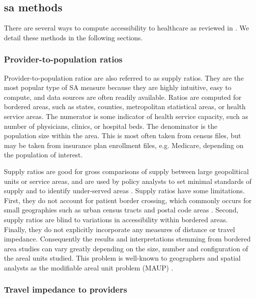 \subsection{\acf{sa} methods}

There are several ways to compute accessibility to healthcare as reviewed in \cite{guagliardo_spatial_2004}. We detail these methods in the following sections.

\subsubsection*{Provider-to-population ratios}


Provider-to-population ratios are also referred to as supply ratios. They are the most popular type of SA measure because they are highly intuitive, easy to compute, and data sources are often readily available. Ratios are computed for bordered areas, such as states, counties, metropolitan statistical areas, or health service areas. The numerator is some indicator of health service capacity, such as number of physicians, clinics, or hospital beds. The denominator is the population size within the area. This is most often taken from census files, but may be taken from insurance plan enrollment files, e.g. Medicare, depending on the population of interest.

Supply ratios are good for gross comparisons of supply between large geopolitical units or service areas, and are used by policy analysts to set minimal standards of supply and to identify under-served areas \cite{schonfeld_numbers_1972,council_on_graduate_medical_education_physician_1998,connor_competition_1995}. Supply ratios have some limitations. First, they do not account for patient border crossing, which commonly occurs for small geographies such as urban census tracts and postal code areas \cite{connor_measuring_1994,basu_border-crossing_1996,basu_medicare_1995,holahan_border_1993}. Second, supply ratios are blind to variations in accessibility within bordered areas. Finally, they do not explicitly incorporate any measures of distance or travel impedance. Consequently the results and interpretations stemming from bordered area studies can vary greatly depending on the size, number and configuration of the areal units studied. This problem is well-known to geographers and spatial analysts as the modifiable areal unit problem (MAUP) \cite{openshaw_modifiable_1983}.

\subsubsection*{Travel impedance to providers}

